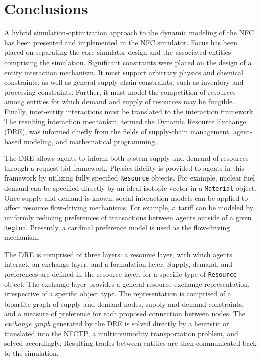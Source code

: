 \section{Conclusions}\label{sec:concl}

A hybrid simulation-optimization approach to the dynamic modeling of the NFC has
been presented and implemented in the \Cyclus NFC simulator. Focus has been
placed on separating the core simulator design and the associated entities
comprising the simulation. Significant constraints were placed on the design of
a entity interaction mechanism. It must support arbitrary physics and chemical
constraints, as well as general supply-chain constraints, such as inventory and
processing constraints. Further, it must model the competition of resources
among entities for which demand and supply of resources may be
fungible. Finally, inter-entity interactions must be translated to the
interaction framework. The resulting interaction mechanism, termed the Dynamic
Resource Exchange (DRE), was informed chiefly from the fields of supply-chain
management, agent-based modeling, and mathematical programming.

The DRE allows agents to inform both system supply and demand of resources
through a request-bid framework. Physics fidelity is provided to agents in this
framework by utilizing fully specified \texttt{Resource} objects. For example,
nuclear fuel demand can be specified directly by an ideal isotopic vector in a
\texttt{Material} object. Once supply and demand is known, social interaction
models can be applied to affect resource flow-driving mechanisms. For example, a
tariff can be modeled by uniformly reducing preferences of transactions between
agents outside of a given \texttt{Region}. Presently, a cardinal preference
model is used as the flow-driving mechanism.

The DRE is comprised of three layers: a resource layer, with which agents
interact, an exchange layer, and a formulation layer. Supply, demand, and
preferences are defined in the resource layer, for a specific type of
\texttt{Resource} object. The exchange layer provides a general resource
exchange representation, irrespective of a specific object type. The
representation is comprised of a bipartite graph of supply and demand nodes,
supply and demand constraints, and a measure of preference for each proposed
connection between nodes. The \textit{exchange graph} generated by the DRE is
solved directly by a heuristic or translated into the NFCTP, a multicommodity
transportation problem, and solved accordingly. Resulting trades between
entities are then communicated back to the simulation.

